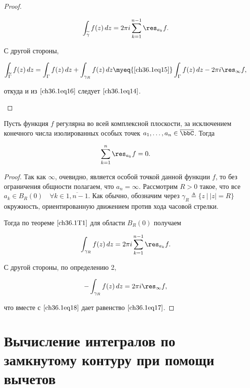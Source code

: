 \begin{proof}
\begin{enumerate}
\begin{equation} \label{ch36.1eq16}
\int_{\widetilde{\gamma}} f(z) \,dz = 2\pi i \sum_{k = 1}^{n - 1} \res_{a_k} f.
\end{equation}
 
С другой стороны,

$$
\int_{\widetilde{\Gamma}} f(z) \,dz = \int_{\Gamma} f(z) \,dz + \int_{\gamma_R} f(z) \,dz \myeq{\eqref{ch36.1eq15}} \int_{\Gamma} f(z) \,dz - 2\pi i\res_{\infty} f,
$$

откуда и из $\eqref{ch36.1eq16}$ следует $\eqref{ch36.1eq14}$.	

\end{enumerate}
\end{proof}

\begin{cons}
Пусть функция $f$ регулярна во всей комплексной плоскости, за исключением конечного числа изолированных особых точек $a_1,\ldots,a_n \in \overline{\bbC}$. Тогда

\begin{equation} \label{ch36.1eq17}
\sum_{k = 1}^{n} \res_{a_k} f = 0.
\end{equation}
\end{cons}

\begin{proof}
Так как $\infty$, очевидно, является особой точкой данной функции $f$, то без ограничения общности полагаем, что $a_n = \infty$. Рассмотрим $R > 0$ такое, что все $a_k \in B_R(0) \quad \forall k \in \overline{1, n - 1}$. Как обычно, обозначим через $\gamma_R \triangleq \{ z \: \big| \: |z| = R\}$ окружность, ориентированную движением против хода часовой стрелки.

Тогда по теореме $\eqref{ch36.1T1}$ для области $B_R(0)$ получаем

\begin{equation} \label{ch36.1eq18}
\int_{\gamma_R} f(z) \,dz = 2\pi i \sum_{k = 1}^{n - 1} \res_{a_k} f.
\end{equation}

С другой стороны, по определению 2,

$$
- \int_{\gamma_R} f(z) \,dz = 2\pi i \res_{\infty} f,
$$

что вместе с $\eqref{ch36.1eq18}$ дает равенство $\eqref{ch36.1eq17}$.
\end{proof}

\section{Вычисление интегралов по замкнутому контуру при помощи вычетов}

